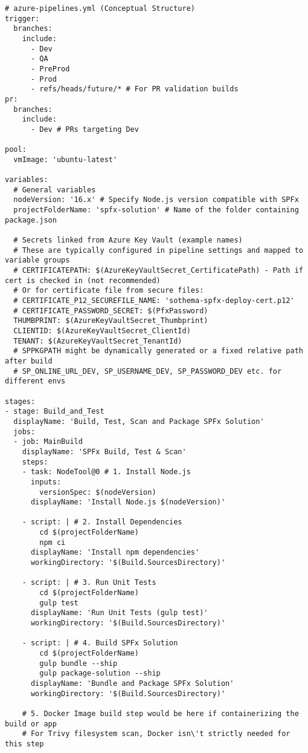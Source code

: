 \begin{framed}
\begin{verbatim}
# azure-pipelines.yml (Conceptual Structure)
trigger:
  branches:
    include:
      - Dev
      - QA
      - PreProd
      - Prod
      - refs/heads/future/* # For PR validation builds
pr:
  branches:
    include:
      - Dev # PRs targeting Dev

pool:
  vmImage: 'ubuntu-latest'

variables:
  # General variables
  nodeVersion: '16.x' # Specify Node.js version compatible with SPFx
  projectFolderName: 'spfx-solution' # Name of the folder containing package.json

  # Secrets linked from Azure Key Vault (example names)
  # These are typically configured in pipeline settings and mapped to variable groups
  # CERTIFICATEPATH: $(AzureKeyVaultSecret_CertificatePath) - Path if cert is checked in (not recommended)
  # Or for certificate file from secure files:
  # CERTIFICATE_P12_SECUREFILE_NAME: 'sothema-spfx-deploy-cert.p12'
  # CERTIFICATE_PASSWORD_SECRET: $(PfxPassword)
  THUMBPRINT: $(AzureKeyVaultSecret_Thumbprint)
  CLIENTID: $(AzureKeyVaultSecret_ClientId)
  TENANT: $(AzureKeyVaultSecret_TenantId)
  # SPPKGPATH might be dynamically generated or a fixed relative path after build
  # SP_ONLINE_URL_DEV, SP_USERNAME_DEV, SP_PASSWORD_DEV etc. for different envs

stages:
- stage: Build_and_Test
  displayName: 'Build, Test, Scan and Package SPFx Solution'
  jobs:
  - job: MainBuild
    displayName: 'SPFx Build, Test & Scan'
    steps:
    - task: NodeTool@0 # 1. Install Node.js
      inputs:
        versionSpec: $(nodeVersion)
      displayName: 'Install Node.js $(nodeVersion)'

    - script: | # 2. Install Dependencies
        cd $(projectFolderName)
        npm ci
      displayName: 'Install npm dependencies'
      workingDirectory: '$(Build.SourcesDirectory)'

    - script: | # 3. Run Unit Tests
        cd $(projectFolderName)
        gulp test
      displayName: 'Run Unit Tests (gulp test)'
      workingDirectory: '$(Build.SourcesDirectory)'

    - script: | # 4. Build SPFx Solution
        cd $(projectFolderName)
        gulp bundle --ship
        gulp package-solution --ship
      displayName: 'Bundle and Package SPFx Solution'
      workingDirectory: '$(Build.SourcesDirectory)'

    # 5. Docker Image build step would be here if containerizing the build or app
    # For Trivy filesystem scan, Docker isn\'t strictly needed for this step


\end{verbatim}
\end{framed}
